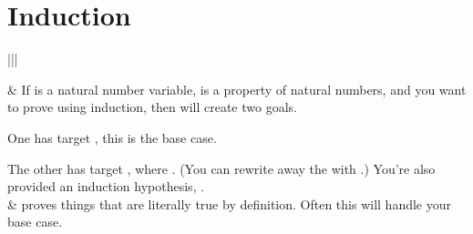 \documentclass[letterpaper,10pt,english]{sphinxmanual}
\begin{document}
\section{Induction}
\label{\detokenize{tactics:induction}}

\begin{savenotes}\sphinxattablestart
\centering
\begin{tabular}[t]{|||}
\hline

\sphinxAtStartPar
{}
&
\sphinxAtStartPar
If  is a natural number variable,  is a property of natural numbers,
and you want to prove  using induction, then  will create two goals.

\sphinxAtStartPar
One has target , this is the base case.

\sphinxAtStartPar
The other has target , where .
(You can rewrite away the  with .)
You’re also provided an induction hypothesis, .
\\
\hline
\sphinxAtStartPar
{}
&
\sphinxAtStartPar
{} proves things that are literally true by definition.
Often this will handle your base case.
\\
\hline
\end{tabular}
\par
\sphinxattableend\end{savenotes}



\renewcommand{\indexname}{Index}
\printindex
\end{document}
